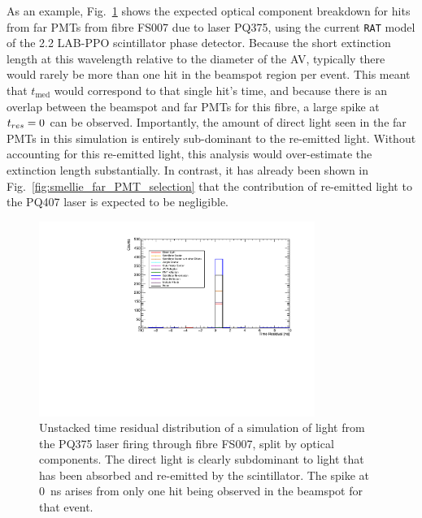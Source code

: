 As an example, Fig.~\ref{fig:smellie_PQ375_far_pmts_components} shows the expected optical component breakdown for hits from far PMTs from fibre FS007 due to laser PQ375, using the current \texttt{RAT} model of the \SI{2.2}{\gpl} LAB-PPO scintillator phase detector. Because the short extinction length at this wavelength relative to the diameter of the AV, typically there would rarely be more than one hit in the beamspot region per event. This meant that $t_{\mathrm{med}}$ would correspond to that single hit's time, and because there is an overlap between the beamspot and far PMTs for this fibre, a large spike at $t_{res}{} = 0$ can be observed. Importantly, the amount of direct light seen in the far PMTs in this simulation is entirely sub-dominant to the re-emitted light. Without accounting for this re-emitted light, this analysis would over-estimate the extinction length substantially. In contrast, it has already been shown in Fig.~\ref{fig:smellie_far_PMT_selection} that the contribution of re-emitted light to the PQ407 laser is expected to be negligible.

\begin{figure}
    \centering
    \includegraphics[width=0.8\textwidth]{5_SMELLIEAnalysis/images/far_pmts_tres_plot_FS007_PQ375.pdf}
    \caption[Unstacked time residual distribution of a simulation of light from the PQ375 laser firing through fibre FS007, split by optical components]
    {Unstacked time residual distribution of a simulation of light from the PQ375 laser firing through fibre FS007, split by optical components. The direct light is clearly subdominant to light that has been absorbed and re-emitted by the scintillator. The spike at \SI{0}{\ns} arises from only one hit being observed in the beamspot for that event.}
    \label{fig:smellie_PQ375_far_pmts_components}
\end{figure}

